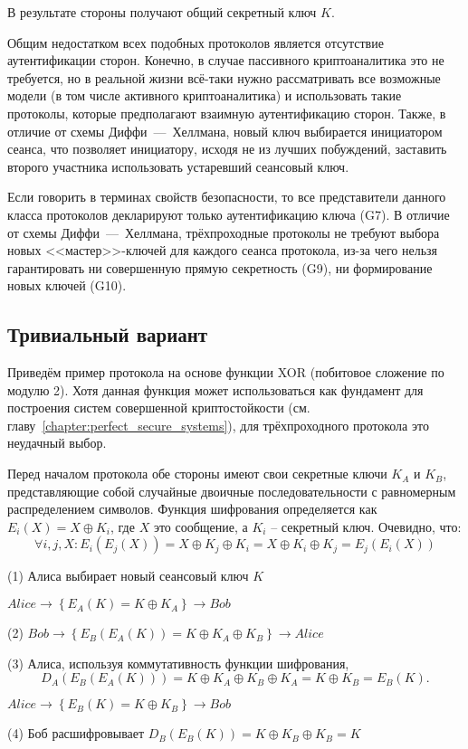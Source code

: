 В результате стороны получают общий секретный ключ $K$.

Общим недостатком всех подобных протоколов является отсутствие аутентификации сторон. Конечно, в случае пассивного криптоаналитика это не требуется, но в реальной жизни всё-таки нужно рассматривать все возможные модели (в том числе активного криптоаналитика) и использовать такие протоколы, которые предполагают взаимную аутентификацию сторон. Также, в отличие от схемы Диффи~---~Хеллмана, новый ключ выбирается инициатором сеанса, что позволяет инициатору, исходя не из лучших побуждений, заставить второго участника использовать устаревший сеансовый ключ.

Если говорить в терминах свойств безопасности, то все представители данного класса протоколов декларируют только аутентификацию ключа (G7). В отличие от схемы Диффи~---~Хеллмана, трёхпроходные протоколы не требуют выбора новых <<мастер>>-ключей для каждого сеанса протокола, из-за чего нельзя гарантировать ни совершенную прямую секретность (G9), ни формирование новых ключей (G10).

\subsection{Тривиальный вариант}

Приведём пример протокола на основе функции XOR (побитовое сложение по модулю 2). Хотя данная функция может использоваться как фундамент для построения систем совершенной криптостойкости (см. главу~\ref{chapter:perfect_secure_systems}), для трёхпроходного протокола это неудачный выбор.

Перед началом протокола обе стороны имеют свои секретные ключи $K_A$ и $K_B$, представляющие собой случайные двоичные последовательности с равномерным распределением символов. Функция шифрования определяется как $E_i( X ) = X \oplus K_i$, где $X$ это сообщение, а $K_i$ -- секретный ключ. Очевидно, что:
\[ \forall i, j, X: E_i \left( E_j \left( X \right) \right) = X \oplus K_j \oplus K_i = X \oplus K_i \oplus K_j = E_j \left( E_i \left( X \right) \right) \]

\begin{protocol}
    \item[(1)] Алиса выбирает новый сеансовый ключ $K$
    \item[{}] $Alice \to \left\{ E_A \left( K \right) = K \oplus K_A \right\} \to Bob$
    \item[(2)] $Bob \to \left\{ E_B \left( E_A \left( K \right) \right) = K \oplus K_A \oplus K_B \right\} \to Alice$
    \item[(3)] Алиса, используя коммутативность функции шифрования,
	\[ D_A \left( E_B \left( E_A \left( K \right) \right) \right) = K \oplus K_A \oplus K_B \oplus K_A = K \oplus K_B = E_B \left( K \right). \]
    \item[{}] $Alice \to \left\{ E_B \left( K \right) = K \oplus K_B \right\} \to Bob$
    \item[(4)] Боб расшифровывает $D_B \left( E_B \left( K \right) \right) = K \oplus K_B \oplus K_B = K$
\end{protocol}

